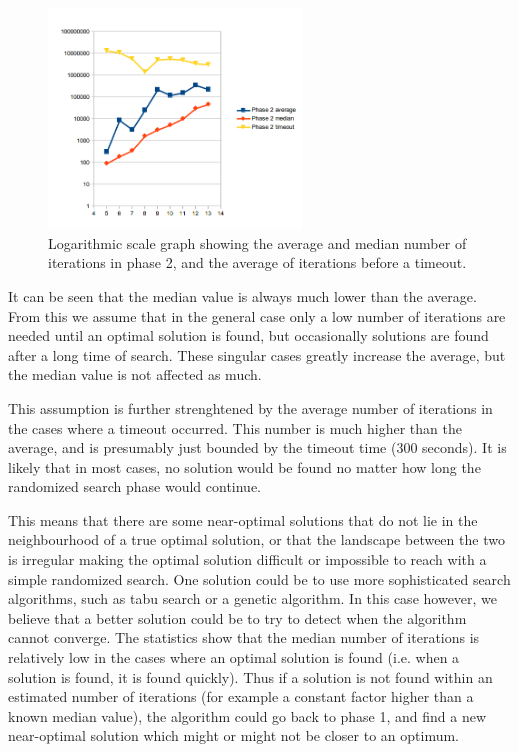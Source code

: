 \documentclass[a4paper,12pt]{article}
\begin{document}
\begin{figure}[!ht]
\begin{center}
\includegraphics[width=0.6\textwidth]{pictures/phase2iterations.png}
 \caption[Close up of \textit{Hemidactylus} sp.]
   {Logarithmic scale graph showing the average and median number of iterations in phase 2, and the average of iterations before a timeout.}
\end{center}
\end{figure}

It can be seen that the median value is always much lower than the average. From this we assume that in the general case only a low number of iterations are needed until an optimal solution is found, but occasionally solutions are found after a long time of search. These singular cases greatly increase the average, but the median value is not affected as much.

This assumption is further strenghtened by the average number of iterations in the cases where a timeout occurred. This number is much higher than the average, and is presumably just bounded by the timeout time (300 seconds). It is likely that in most cases, no solution would be found no matter how long the randomized search phase would continue.

This means that there are some near-optimal solutions that do not lie in the neighbourhood of a true optimal solution, or that the landscape between the two is irregular making the optimal solution difficult or impossible to reach with a simple randomized search. One solution could be to use more sophisticated search algorithms, such as tabu search or a genetic algorithm. In this case however, we believe that a better solution could be to try to detect when the algorithm cannot converge. The statistics show that the median number of iterations is relatively low in the cases where an optimal solution is found (i.e. when a solution is found, it is found quickly). Thus if a solution is not found within an estimated number of iterations (for example a constant factor higher than a known median value), the algorithm could go back to phase 1, and find a new near-optimal solution which might or might not be closer to an optimum.
\end{document}
